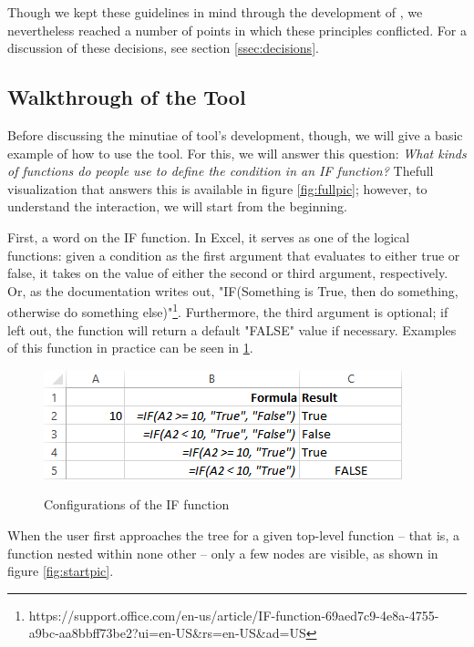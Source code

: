 \documentclass[conference]{IEEEtran}
\begin{document}
	Though we kept these guidelines in mind through the development of \toolname, we
	nevertheless reached a number of points in which these principles conflicted. For
	a discussion of these decisions, see section \ref{ssec:decisions}.
	
	\subsection{Walkthrough of the Tool} Before discussing the minutiae of tool's development,
	though, we will give a basic example of how to use the tool. For this, we will answer this question: \textit{ What kinds of functions do people use to
		define the condition in an IF function?} Thefull  visualization that answers this 
	is available in figure \ref{fig:fullpic}; however, to understand the interaction, we will
	start from the beginning. \par
	
	First, a word on the IF function. In Excel, it serves as one of the logical functions: given
	a condition as the first argument that evaluates to either true or false, it takes on
	the value of either the second or third argument, respectively. Or, as the documentation
	writes out, "IF(Something is True, then do something, otherwise do something 
	else)"\footnote{https://support.office.com/en-us/article/IF-function-69aed7c9-4e8a-4755-a9bc-aa8bbff73be2?ui=en-US\&rs=en-US\&ad=US}.
	Furthermore, the third argument is optional; if left out, the function will return a default
	"FALSE" value if necessary. Examples of this function in practice can be seen in \ref{fig:ifexample}.
	
	\begin{figure}[h]
		\centering
		\includegraphics[width=.5\textwidth]{ifExample}
		\label{fig:ifexample}
		\caption{Configurations of the IF function}
	\end{figure}
	
	When the user first approaches the tree for a given top-level function -- that
	is, a function nested within none other -- only a few nodes are visible, as
	shown in figure \ref{fig:startpic}. \par
	
\end{document}
